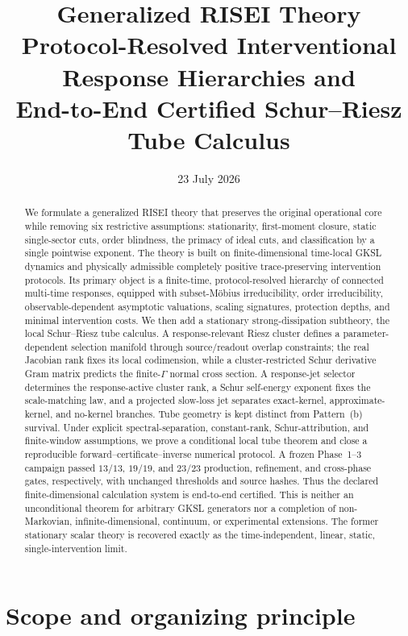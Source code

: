 \documentclass[11pt]{article}
\title{\textbf{Generalized RISEI Theory}\\
\large Protocol-Resolved Interventional Response Hierarchies and\\
End-to-End Certified Schur--Riesz Tube Calculus}
\author{}
\date{23 July 2026}
\theoremstyle{definition}
\theoremstyle{remark}
\begin{document}
\maketitle

\begin{abstract}
We formulate a generalized RISEI theory that preserves the original operational core while removing six restrictive assumptions: stationarity, first-moment closure, static single-sector cuts, order blindness, the primacy of ideal cuts, and classification by a single pointwise exponent. The theory is built on finite-dimensional time-local GKSL dynamics and physically admissible completely positive trace-preserving intervention protocols. Its primary object is a finite-time, protocol-resolved hierarchy of connected multi-time responses, equipped with subset-M\"obius irreducibility, order irreducibility, observable-dependent asymptotic valuations, scaling signatures, protection depths, and minimal intervention costs. We then add a stationary strong-dissipation subtheory, the local Schur--Riesz tube calculus. A response-relevant Riesz cluster defines a parameter-dependent selection manifold through source/readout overlap constraints; the real Jacobian rank fixes its local codimension, while a cluster-restricted Schur derivative Gram matrix predicts the finite-$\Gamma$ normal cross section. A response-jet selector determines the response-active cluster rank, a Schur self-energy exponent fixes the scale-matching law, and a projected slow-loss jet separates exact-kernel, approximate-kernel, and no-kernel branches. Tube geometry is kept distinct from Pattern~(b) survival. Under explicit spectral-separation, constant-rank, Schur-attribution, and finite-window assumptions, we prove a conditional local tube theorem and close a reproducible forward--certificate--inverse numerical protocol. A frozen Phase~1--3 campaign passed $13/13$, $19/19$, and $23/23$ production, refinement, and cross-phase gates, respectively, with unchanged thresholds and source hashes. Thus the declared finite-dimensional calculation system is end-to-end certified. This is neither an unconditional theorem for arbitrary GKSL generators nor a completion of non-Markovian, infinite-dimensional, continuum, or experimental extensions. The former stationary scalar theory is recovered exactly as the time-independent, linear, static, single-intervention limit.
\end{abstract}

\tableofcontents

\section{Scope and organizing principle}
\end{document}
